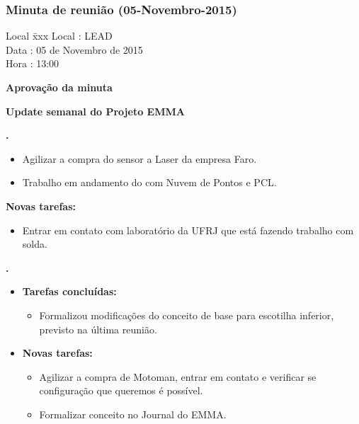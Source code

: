 \subsubsection{Minuta de reunião (05-Novembro-2015)}

\begin{tabbing}
  Local \= xxx \kill
  Local \> : LEAD \\
  Data  \> : 05 de Novembro de 2015 \\
  Hora  \> : 13:00
\end{tabbing} 


\textbf{Aprovação da minuta}

\textbf{Update semanal do Projeto EMMA}
   									
						
\textbf{\gabriel.} 
	\begin{itemize}
			\item Agilizar a compra do sensor a Laser da empresa Faro.
			\item Trabalho em andamento do com Nuvem de Pontos e PCL.
			\end{itemize}
		
		\item \textbf{Novas tarefas:}
			\begin{itemize} 
				\item Entrar em contato com laboratório da UFRJ que está fazendo trabalho
				com solda.
			\end{itemize}

					
			
   \textbf{.} 
	\begin{itemize}
		\item \textbf{Tarefas concluídas:}
			\begin{itemize}    
			    \item Formalizou modificações do conceito de base para escotilha
			    inferior, previsto na última reunião.
				
			\end{itemize}
		
		\item \textbf{Novas tarefas:}
			\begin{itemize} 
			    \item Agilizar a compra de Motoman, entrar em contato e verificar
			    se configuração que queremos é possível.
			    \item Formalizar conceito no Journal do EMMA.
			\end{itemize}
	\end{itemize}

